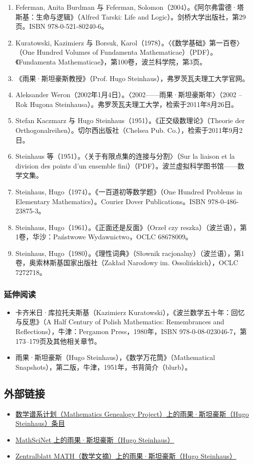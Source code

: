 \begin{enumerate}
  \item Feferman, Anita Burdman 与 Feferman, Solomon（2004）。《阿尔弗雷德·塔斯基：生命与逻辑》（Alfred Tarski: Life and Logic）。剑桥大学出版社，第29页。ISBN 978-0-521-80240-6。
  \item Kuratowski, Kazimierz 与 Borsuk, Karol（1978）。〈《数学基础》第一百卷〉（One Hundred Volumes of Fundamenta Mathematicae）（PDF）。《Fundamenta Mathematicae》，第100卷，波兰科学院，第3页。
  \item 《雨果·斯坦豪斯教授》（Prof. Hugo Steinhaus），弗罗茨瓦夫理工大学官网。
  \item Aleksander Weron（2002年1月4日）。〈2002——雨果·斯坦豪斯年〉（2002 – Rok Hugona Steinhausa）。弗罗茨瓦夫理工大学，检索于2011年8月26日。
  \item Stefan Kaczmarz 与 Hugo Steinhaus（1951）。《正交级数理论》（Theorie der Orthogonalreihen）。切尔西出版社（Chelsea Pub. Co.），检索于2011年9月2日。
  \item Steinhaus 等（1951）。〈关于有限点集的连接与分割〉（Sur la liaison et la division des points d'un ensemble fini）（PDF）。波兰虚拟科学图书馆——数学文集。
  \item Steinhaus, Hugo（1974）。《一百道初等数学题》（One Hundred Problems in Elementary Mathematics）。Courier Dover Publications。ISBN 978-0-486-23875-3。
  \item Steinhaus, Hugo（1961）。《正面还是反面》（Orzeł czy reszka）（波兰语），第1卷，华沙：Państwowe Wydawnictwo，OCLC 68678009。
  \item Steinhaus, Hugo（1980）。《理性词典》（Słownik racjonalny）（波兰语），第1卷，奥索林斯基国家出版社（Zakład Narodowy im. Ossolińskich），OCLC 7272718。
\end{enumerate}
\subsubsection{延伸阅读}
\begin{itemize}
  \item 卡齐米日·库拉托夫斯基（Kazimierz Kuratowski），《波兰数学五十年：回忆与反思》（A Half Century of Polish Mathematics: Remembrances and Reflections），牛津：Pergamon Press，1980年，ISBN 978-0-08-023046-7，第173–179页及其他相关章节。
  \item 雨果·斯坦豪斯（Hugo Steinhaus），《数学万花筒》（Mathematical Snapshots），第二版，牛津，1951年，书背简介（blurb）。
\end{itemize}
\subsection{外部链接}
\begin{itemize}
  \item \href{https://www.mathgenealogy.org/id.php?id=8016}{数学谱系计划（Mathematics Genealogy Project）上的雨果·斯坦豪斯（Hugo Steinhaus）条目}
  \item \href{https://mathscinet.ams.org/mathscinet/search/author.html?mrauthid=70027}{MathSciNet 上的雨果·斯坦豪斯（Hugo Steinhaus）}
  \item \href{https://zbmath.org/authors/?q=ai:steinhaus.hugo}{Zentralblatt MATH（数学文摘）上的雨果·斯坦豪斯（Hugo Steinhaus）}
\end{itemize}
